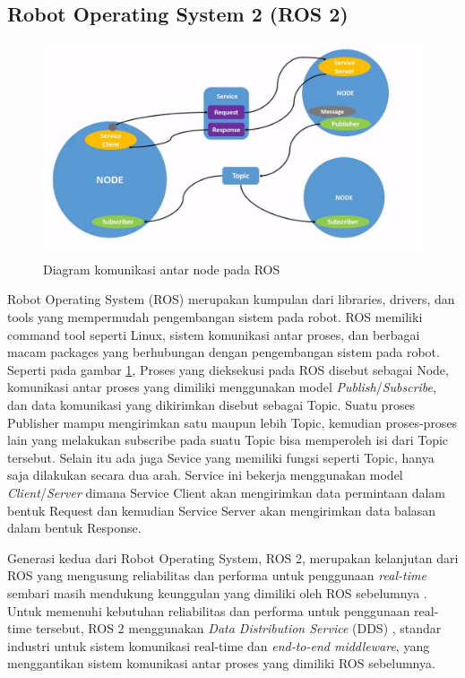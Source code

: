 \subsection{Robot Operating System 2 (ROS 2)}

\begin{figure} [ht] \centering
	\includegraphics[scale=0.45]{gambar/ros-communication.png}
	\caption{Diagram komunikasi antar node pada ROS \citep{Ros2Nodes}}
	\label{fig:RosCommunication}
\end{figure}

Robot Operating System (ROS) \citep{Quigley2009} merupakan kumpulan dari libraries, drivers, dan tools yang mempermudah pengembangan sistem pada robot.
ROS memiliki command tool seperti Linux, sistem komunikasi antar proses, dan berbagai macam packages yang berhubungan dengan pengembangan sistem pada robot.
Seperti pada gambar \ref{fig:RosCommunication}, Proses yang dieksekusi pada ROS disebut sebagai Node, komunikasi antar proses yang dimiliki menggunakan model \emph{Publish}/\emph{Subscribe}, dan data komunikasi yang dikirimkan disebut sebagai Topic.
Suatu proses Publisher mampu mengirimkan satu maupun lebih Topic, kemudian proses-proses lain yang melakukan subscribe pada suatu Topic bisa memperoleh isi dari Topic tersebut.
Selain itu ada juga Sevice yang memiliki fungsi seperti Topic, hanya saja dilakukan secara dua arah.
Service ini bekerja menggunakan model \emph{Client}/\emph{Server} dimana Service Client akan mengirimkan data permintaan dalam bentuk Request dan kemudian Service Server akan mengirimkan data balasan dalam bentuk Response.

Generasi kedua dari Robot Operating System, ROS 2, merupakan kelanjutan dari ROS yang mengusung reliabilitas dan performa untuk penggunaan \emph{real-time} sembari masih mendukung keunggulan yang dimiliki oleh ROS sebelumnya \citep{Maruyama2016}.
Untuk memenuhi kebutuhan reliabilitas dan performa untuk penggunaan real-time tersebut, ROS 2 menggunakan \emph{Data Distribution Service} (DDS) \citep{Castellote2003} \citep{Schlesselman2004}, standar industri untuk sistem komunikasi real-time dan \emph{end-to-end middleware}, yang menggantikan sistem komunikasi antar proses yang dimiliki ROS sebelumnya.

